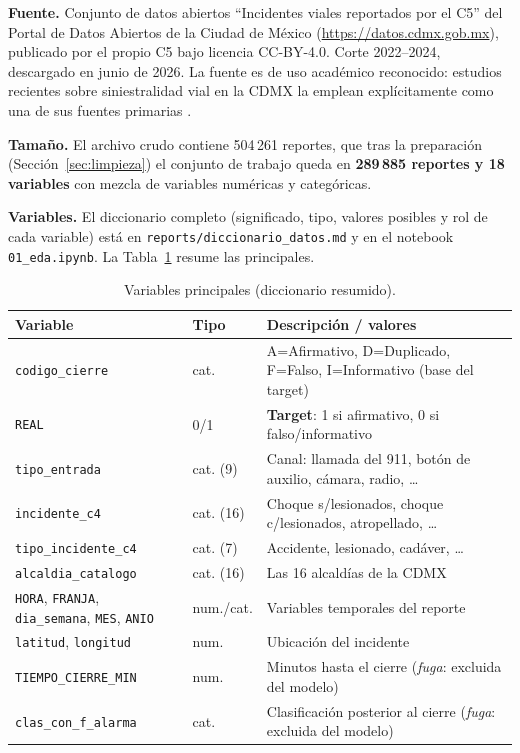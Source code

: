 \documentclass[11pt,letterpaper]{article}
\begin{document}
\textbf{Fuente.} Conjunto de datos abiertos ``Incidentes viales reportados por
el C5'' del Portal de Datos Abiertos de la Ciudad de México
(\url{https://datos.cdmx.gob.mx}), publicado por el propio C5 bajo licencia
CC-BY-4.0. Corte 2022--2024, descargado en junio de 2026. La fuente es de uso
académico reconocido: estudios recientes sobre siniestralidad vial en la CDMX
la emplean explícitamente como una de sus fuentes primarias
\cite{herreraortiz}.

\textbf{Tamaño.} El archivo crudo contiene 504\,261 reportes, que tras la
preparación (Sección~\ref{sec:limpieza}) el conjunto de trabajo queda en
\textbf{289\,885 reportes y 18 variables} con mezcla de variables numéricas y
categóricas.

\textbf{Variables.} El diccionario completo (significado, tipo, valores
posibles y rol de cada variable) está en \texttt{reports/diccionario\_datos.md}
y en el notebook \texttt{01\_eda.ipynb}. La Tabla~\ref{tab:dic} resume las
principales.

\begin{table}[H]
\centering
\caption{Variables principales (diccionario resumido).}
\label{tab:dic}
\footnotesize
\begin{tabularx}{\textwidth}{@{}p{3.6cm} l >{\raggedright\arraybackslash}X@{}}
\toprule
\textbf{Variable} & \textbf{Tipo} & \textbf{Descripción / valores} \\
\midrule
\texttt{codigo\_cierre} & cat. & A=Afirmativo, D=Duplicado, F=Falso, I=Informativo (base del target)\\
\texttt{REAL} & 0/1 & \textbf{Target}: 1 si afirmativo, 0 si falso/informativo\\
\texttt{tipo\_entrada} & cat. (9) & Canal: llamada del 911, botón de auxilio, cámara, radio, \dots\\
\texttt{incidente\_c4} & cat. (16) & Choque s/lesionados, choque c/lesionados, atropellado, \dots\\
\texttt{tipo\_incidente\_c4} & cat. (7) & Accidente, lesionado, cadáver, \dots\\
\texttt{alcaldia\_catalogo} & cat. (16) & Las 16 alcaldías de la CDMX\\
\texttt{HORA}, \texttt{FRANJA}, \texttt{dia\_semana}, \texttt{MES}, \texttt{ANIO} & num./cat. & Variables temporales del reporte\\
\texttt{latitud}, \texttt{longitud} & num. & Ubicación del incidente\\
\texttt{TIEMPO\_CIERRE\_MIN} & num. & Minutos hasta el cierre (\emph{fuga}: excluida del modelo)\\
\texttt{clas\_con\_f\_alarma} & cat. & Clasificación posterior al cierre (\emph{fuga}: excluida del modelo)\\
\bottomrule
\end{tabularx}
\end{table}
\end{document}
